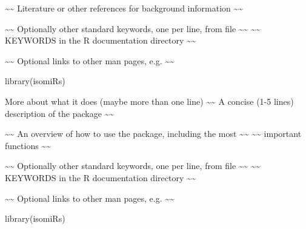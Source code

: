 \documentclass[a4paper]{book}
\begin{document}
%
\begin{References}\relax
\textasciitilde{}\textasciitilde{} Literature or other references for background information \textasciitilde{}\textasciitilde{}
\end{References}
%
\begin{SeeAlso}\relax
\textasciitilde{}\textasciitilde{} Optionally other standard keywords, one per line, from file \textasciitilde{}\textasciitilde{}
\textasciitilde{}\textasciitilde{} KEYWORDS in the R documentation directory \textasciitilde{}\textasciitilde{}

\textasciitilde{}\textasciitilde{} Optional links to other man pages, e.g. \textasciitilde{}\textasciitilde{}

\end{SeeAlso}
%
\begin{Examples}
\begin{ExampleCode}

library(isomiRs)

\end{ExampleCode}
\end{Examples}
%
\begin{Description}\relax
More about what it does (maybe more than one line)
\textasciitilde{}\textasciitilde{} A concise (1-5 lines) description of the package \textasciitilde{}\textasciitilde{}
\end{Description}
%
\begin{Details}\relax
\textasciitilde{}\textasciitilde{} An overview of how to use the package, including the most \textasciitilde{}\textasciitilde{}
\textasciitilde{}\textasciitilde{} important functions \textasciitilde{}\textasciitilde{}
\end{Details}
%
\begin{SeeAlso}\relax
\textasciitilde{}\textasciitilde{} Optionally other standard keywords, one per line, from file \textasciitilde{}\textasciitilde{}
\textasciitilde{}\textasciitilde{} KEYWORDS in the R documentation directory \textasciitilde{}\textasciitilde{}

\textasciitilde{}\textasciitilde{} Optional links to other man pages, e.g. \textasciitilde{}\textasciitilde{}

\end{SeeAlso}
%
\begin{Examples}
\begin{ExampleCode}

library(isomiRs)

\end{ExampleCode}
\end{Examples}
\printindex{}
\end{document}
